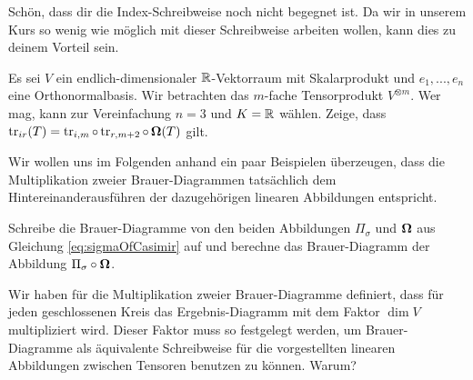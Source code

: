 \begin{sheet}
\begin{problem}[title={Was denn für Indizes?}]
	Schön, dass dir die Index-Schreibweise noch nicht begegnet ist. Da wir in unserem Kurs so wenig wie möglich mit dieser Schreibweise arbeiten wollen, kann dies zu deinem Vorteil sein.

	Es sei $V$ ein endlich-dimensionaler $\mathbb{R}$-Vektorraum mit Skalarprodukt und $e_1, ..., e_n$ eine Orthonormalbasis. Wir betrachten das $m$-fache Tensorprodukt $V^{\otimes m}$. Wer mag, kann zur Vereinfachung $n=3$ und $K=\mathbb{R}$ wählen. Zeige, dass $\operatorname{tr}_{ir}(T)=\operatorname{tr}_{i,m}\circ\operatorname{tr}_{r,m+2}\circ\operatorname{\mathbf{\Omega}}(T)$ gilt.

\end{problem}

\begin{problem}[title={Brauer-Diagramme}]
	Wir wollen uns im Folgenden anhand ein paar Beispielen überzeugen, dass die Multiplikation zweier Brauer-Diagrammen tatsächlich dem Hintereinanderausführen der dazugehörigen linearen Abbildungen entspricht.
	\begin{subproblem}
		Schreibe die Brauer-Diagramme von den beiden Abbildungen $\Pi_\sigma$ und $\operatorname{\mathbf{\Omega}}$ aus Gleichung \ref{eq:sigmaOfCasimir} auf und berechne das Brauer-Diagramm der  Abbildung $\Pi_\sigma \circ\operatorname{\mathbf{\Omega}}$.
	\end{subproblem}
	\begin{subproblem}
		Wir haben für die Multiplikation zweier Brauer-Diagramme definiert, dass für jeden geschlossenen Kreis das Ergebnis-Diagramm mit dem Faktor $\dim{V}$ multipliziert wird. Dieser Faktor muss so festgelegt werden, um Brauer-Diagramme als äquivalente Schreibweise für die vorgestellten linearen Abbildungen zwischen Tensoren benutzen zu können. Warum?
		

\end{subproblem}
\end{problem}
\end{sheet}
